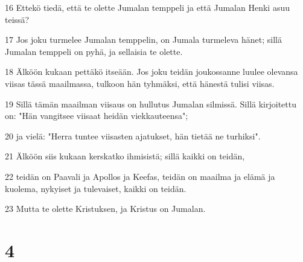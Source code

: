 \par 16 Ettekö tiedä, että te olette Jumalan temppeli ja että Jumalan Henki asuu teissä?
\par 17 Jos joku turmelee Jumalan temppelin, on Jumala turmeleva hänet; sillä Jumalan temppeli on pyhä, ja sellaisia te olette.
\par 18 Älköön kukaan pettäkö itseään. Jos joku teidän joukossanne luulee olevansa viisas tässä maailmassa, tulkoon hän tyhmäksi, että hänestä tulisi viisas.
\par 19 Sillä tämän maailman viisaus on hullutus Jumalan silmissä. Sillä kirjoitettu on: "Hän vangitsee viisaat heidän viekkauteensa";
\par 20 ja vielä: "Herra tuntee viisasten ajatukset, hän tietää ne turhiksi".
\par 21 Älköön siis kukaan kerskatko ihmisistä; sillä kaikki on teidän,
\par 22 teidän on Paavali ja Apollos ja Keefas, teidän on maailma ja elämä ja kuolema, nykyiset ja tulevaiset, kaikki on teidän.
\par 23 Mutta te olette Kristuksen, ja Kristus on Jumalan.

\chapter{4}

